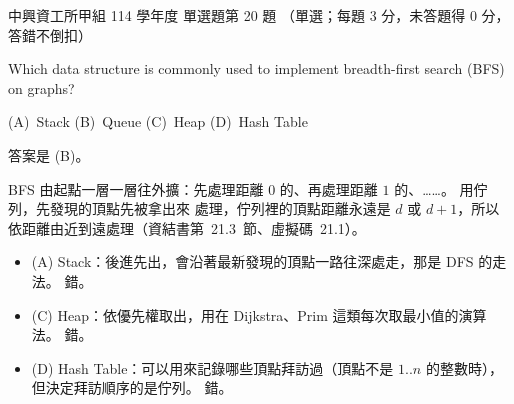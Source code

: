 \begin{pastexam}[label={px:nchu-114-dsa-20}]{中興資工所甲組 114 學年度 單選題第 20 題}
（單選；每題 3 分，未答題得 0 分，答錯不倒扣）

Which data structure is commonly used to implement breadth-first search (BFS) on graphs?

(A)~Stack \qquad (B)~Queue \qquad (C)~Heap \qquad (D)~Hash Table
\end{pastexam}

\begin{pastsoln}
答案是 (B)。

BFS 由起點一層一層往外擴：先處理距離 $0$ 的、再處理距離 $1$ 的、……。 用佇列，先發現的頂點先被拿出來
處理，佇列裡的頂點距離永遠是 $d$ 或 $d + 1$，所以依距離由近到遠處理（資結書第~21.3~節、虛擬碼~21.1）。
\begin{itemize}
\item (A) Stack：後進先出，會沿著最新發現的頂點一路往深處走，那是 DFS 的走法。 錯。
\item (C) Heap：依優先權取出，用在 Dijkstra、Prim 這類每次取最小值的演算法。 錯。
\item (D) Hash Table：可以用來記錄哪些頂點拜訪過（頂點不是 $1..n$ 的整數時），但決定拜訪順序的是佇列。 錯。
\end{itemize}
\end{pastsoln}
